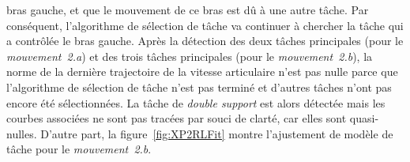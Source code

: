 bras gauche, et que le mouvement de ce bras est dû à une autre t\^ache.
Par conséquent, l'algorithme de sélection de t\^ache va continuer à chercher la t\^ache
qui a contrôlée le bras gauche.
Après la détection des deux t\^aches principales (pour le \emph{mouvement~2.a}) et des 
trois t\^aches principales (pour le \emph{mouvement~2.b}), 
la norme de la dernière trajectoire de la vitesse articulaire n'est pas nulle parce que
l'algorithme de sélection de t\^ache n'est pas terminé et d'autres t\^aches n'ont pas encore
été sélectionnées.
La t\^ache de \emph{double support} est alors détectée mais les courbes associées 
ne sont pas tracées par souci de clarté, car elles sont quasi-nulles.
D'autre part, la figure~\ref{fig:XP2RLFit} montre l'ajustement de modèle de t\^ache pour le \emph{mouvement~2.b}.
\begin{figure*}[p]
\centering
\subfigure{
  \resizebox{.47\textwidth}{!} {
      
    }      
    }
\subfigure{
  \resizebox{.47\textwidth}{!} {
      
    }
    }
\caption[Ajustement de modèle de t\^ache pour le \emph{mouvement~2.b}.]{L'ajustement de modèle de t\^ache pour le \emph{mouvement~2.b} pour les t\^aches de 
\emph{prise droite} et \emph{prise gauche}. Les deux mouvements de la main gauche et de
la main droite sont correctement ajustés par le modèle, avec un petit résidu: 
les t\^aches sont bien détectées.}
\label{fig:XP2RLFit}
\end{figure*}
\FloatBarrier
